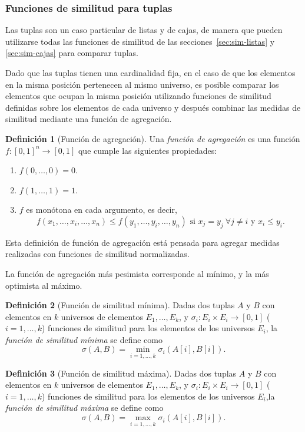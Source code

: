 \documentclass[a4paper,10pt,twoside]{article}
\theoremstyle{definition}
\newtheorem{definition}{Definición}
\begin{document}
\subsubsection{Funciones de similitud para tuplas}
\label{sec:sim-tuplas}
Las tuplas son un caso particular de listas y de cajas, de manera
que pueden utilizarse todas las funciones de similitud de las secciones~\ref{sec:sim-listas} y \ref{sec:sim-cajas} para comparar tuplas.

Dado que las tuplas tienen una cardinalidad fija, en el caso de que los elementos en la misma posición pertenecen al mismo universo, es posible comparar los elementos que ocupan la misma posición utilizando funciones de similitud definidas sobre los elementos de cada universo y después combinar las medidas de similitud mediante una función de agregación. 

\begin{definition}[Función de agregación]
Una \emph{función de agregación} es una función \mbox{$f:[0,1]^n\longrightarrow [0,1]$} que cumple las siguientes propiedades:
\begin{enumerate}[noitemsep,label=\textit{\alph*})]
\item $f(0,\ldots, 0) = 0$.
\item $f(1,\ldots, 1) = 1$.
\item $f$ es monótona en cada argumento, es decir, \[f(x_1,\ldots,x_i,\ldots,x_n)\leq f(y_1,\ldots,y_i,\ldots,y_n)\mbox{ si $x_j=y_j\ \forall j\neq i$ y $x_i\leq y_i$}.
\]
\end{enumerate}
\end{definition}

Esta definición de función de agregación está pensada para agregar medidas realizadas con funciones de similitud normalizadas.

La función de agregación más pesimista corresponde al mínimo, y la más optimista al máximo. 

\begin{definition}[Función de similitud mínima]
Dadas dos tuplas $A$ y $B$ con elementos en $k$ universos de elementos $E_1,\ldots,E_k$, y \mbox{$\sigma_i: E_i\times E_i \longrightarrow [0,1]$} ($i=1,\ldots,k$) funciones de similitud para los elementos de los universos $E_i$, la \emph{función de similitud mínima} se define como
\[
\sigma(A,B)=\min_{i=1,\ldots,k}\sigma_i(A[i],B[i]).
\]
\end{definition}

\begin{definition}[Función de similitud máxima]
Dadas dos tuplas $A$ y $B$ con elementos en $k$ universos de elementos $E_1,\ldots,E_k$, y \mbox{$\sigma_i: E_i\times E_i \longrightarrow [0,1]$} ($i=1,\ldots,k$) funciones de similitud para los elementos de los universos $E_i$,la \emph{función de similitud máxima} se define como
\[
\sigma(A,B)=\max_{i=1,\ldots,k}\sigma_i(A[i],B[i]).
\]
\end{definition}
\end{document}
